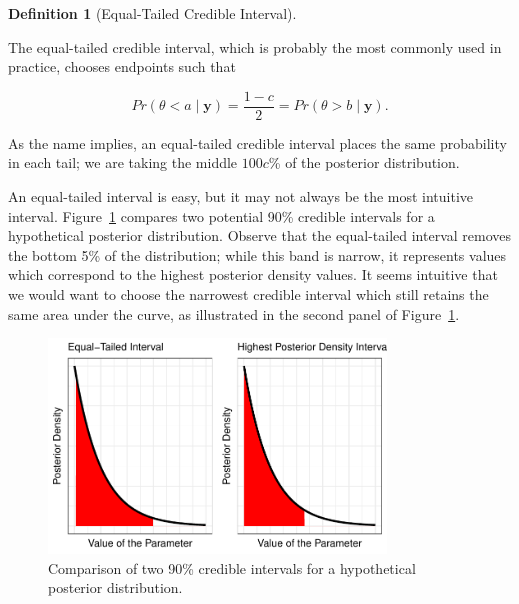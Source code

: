 \documentclass[
  letterpaper,
  DIV=11,
  numbers=noendperiod]{scrreprt}
\theoremstyle{definition}
\theoremstyle{definition}
\newtheorem{definition}{Definition}[chapter]
\theoremstyle{plain}
\theoremstyle{remark}
\begin{document}
\begin{definition}[Equal-Tailed Credible
Interval]\protect\hypertarget{def-equal-tail-interval}{}\label{def-equal-tail-interval}

The equal-tailed credible interval, which is probably the most commonly
used in practice, chooses endpoints such that

\[Pr(\theta < a \mid \mathbf{y}) = \frac{1-c}{2} = Pr(\theta > b \mid \mathbf{y}).\]

\end{definition}

As the name implies, an equal-tailed credible interval places the same
probability in each tail; we are taking the middle \(100c\)\% of the
posterior distribution.

An equal-tailed interval is easy, but it may not always be the most
intuitive interval.
Figure~\ref{fig-interval-estimation-compare-intervals} compares two
potential 90\% credible intervals for a hypothetical posterior
distribution. Observe that the equal-tailed interval removes the bottom
5\% of the distribution; while this band is narrow, it represents values
which correspond to the highest posterior density values. It seems
intuitive that we would want to choose the narrowest credible interval
which still retains the same area under the curve, as illustrated in the
second panel of Figure~\ref{fig-interval-estimation-compare-intervals}.

\begin{figure}

{\centering \includegraphics[width=0.8\textwidth,height=\textheight]{./images/fig-interval-estimation-compare-intervals-1.pdf}

}

\caption{\label{fig-interval-estimation-compare-intervals}Comparison of
two 90\% credible intervals for a hypothetical posterior distribution.}

\end{figure}
\end{document}
